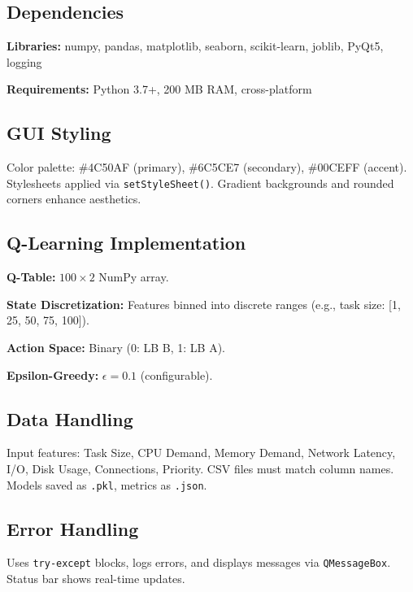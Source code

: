 \documentclass[runningheads]{llncs}
\begin{document}
\subsection{Dependencies}
\item \textbf{Libraries:} numpy, pandas, matplotlib, seaborn, scikit-learn, joblib, PyQt5, logging
    \item \textbf{Requirements:} Python 3.7+, 200 MB RAM, cross-platform

\subsection{GUI Styling}
Color palette: \#4C50AF (primary), \#6C5CE7 (secondary), \#00CEFF (accent). Stylesheets applied via \texttt{setStyleSheet()}. Gradient backgrounds and rounded corners enhance aesthetics.

\subsection{Q-Learning Implementation}
\item \textbf{Q-Table:} $100 \times 2$ NumPy array.
    \item \textbf{State Discretization:} Features binned into discrete ranges (e.g., task size: [1, 25, 50, 75, 100]).
    \item \textbf{Action Space:} Binary (0: LB B, 1: LB A).
    \item \textbf{Epsilon-Greedy:} $\epsilon = 0.1$ (configurable).

\subsection{Data Handling}
Input features: Task Size, CPU Demand, Memory Demand, Network Latency, I/O, Disk Usage, Connections, Priority. CSV files must match column names. Models saved as \texttt{.pkl}, metrics as \texttt{.json}.

\subsection{Error Handling}
Uses \texttt{try-except} blocks, logs errors, and displays messages via \texttt{QMessageBox}. Status bar shows real-time updates.
\end{document}
